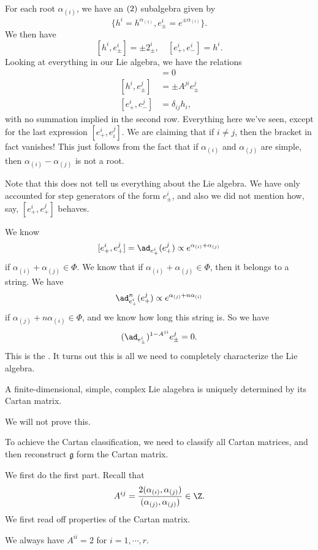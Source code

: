 \documentclass[a4paper]{article}
\begin{document}
For each root $\alpha_{(i)}$, we have an $\sl(2)$ subalgebra given by
\[
  \{h^i = h^{\alpha_{(1)}}, e_{\pm}^i = e^{\pm \alpha_{(i)}}\}.
\]
We then have
\[
  [h^i, e_{\pm}^i] = \pm 2^i_{\pm},\quad [e_+^i, e_-^i] = h^i.
\]
Looking at everything in our Lie algebra, we have the relations
\begin{align*}
  [h^i, h^j] &= 0\\
  [h^i, e^j_{\pm}] &= \pm A^{ji} e^j_{\pm}\\
  [e_+^i, e_-^j] &= \delta_{ij} h_i,
\end{align*}
with no summation implied in the second row. Everything here we've seen, except for the last expression $[e_+^i, e_i^j]$. We are claiming that if $i \not= j$, then the bracket in fact vanishes! This just follows from the fact that if $\alpha_{(i)}$ and $\alpha_{(j)}$ are simple, then $\alpha_{(i)} - \alpha_{(j)}$ is not a root.

Note that this does not tell us everything about the Lie algebra. We have only accounted for step generators of the form $e_{\pm}^i$, and also we did not mention how, say, $[e_+^i, e_+^j]$ behaves.

We know
\[
  [e_+^i, e_+^j] = \ad_{e^i_+}(e_+^j) \propto e^{\alpha_{(i)} + \alpha_{(j)}}
\]
if $\alpha_{(i)} + \alpha_{(j)} \in \Phi$. We know that if $\alpha_{(i)} + \alpha_{(j)} \in \Phi$, then it belongs to a string. We have
\[
  \ad_{e_+^i}^n (e_+^j) \propto e^{\alpha_{(j)} + n \alpha_{(i)}}
\]
if $\alpha_{(j)} + n \alpha_{(i)} \in \Phi$, and we know how long this string is. So we have
\[
  (\ad_{e_{\pm}^i})^{1 - A^{ji}} e^j_{\pm} = 0.
\]
This is the . It turns out this is all we need to completely characterize the Lie algebra.

\begin{thm}[Cartan]
  A finite-dimensional, simple, complex Lie alagebra is uniquely determined by its Cartan matrix.
\end{thm}

We will not prove this.

To achieve the Cartan classification, we need to classify all Cartan matrices, and then reconstruct $\mathfrak{g}$ form the Cartan matrix.

We first do the first part. Recall that
\[
  A^{ij} = \frac{2 (\alpha_{(i)}, \alpha_{(j)})}{(\alpha_{(j)}, \alpha_{(j)})} \in \Z.
\]
We first read off properties of the Cartan matrix.
\begin{prop}
  We always have $A^{ii} = 2$ for $i = 1, \cdots, r$.
\end{prop}
\end{document}
